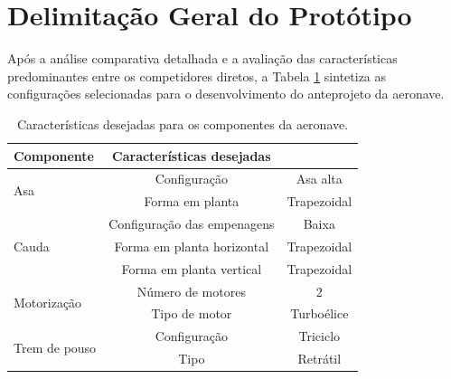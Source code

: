 \section{Delimitação Geral do Protótipo}

Após a análise comparativa detalhada e a avaliação das características predominantes entre os competidores diretos, a Tabela \ref{tab:delimitacao_prototipo} sintetiza as configurações selecionadas para o desenvolvimento do anteprojeto da aeronave.

\begin{table}[h!]
\centering
\caption{Características desejadas para os componentes da aeronave.}
\label{tab:delimitacao_prototipo}
\vspace{0.2cm} %
\renewcommand{\arraystretch}{1.2} %
\begin{tabular}{lcc}
\hline
\textbf{Componente} & \textbf{Características desejadas} & \\
\hline
\multirow{2}{*}{Asa} & Configuração & Asa alta \\
 & Forma em planta & Trapezoidal \\
\hline
\multirow{3}{*}{Cauda} & Configuração das empenagens & Baixa \\
 & Forma em planta horizontal & Trapezoidal \\
 & Forma em planta vertical & Trapezoidal \\
\hline
\multirow{2}{*}{Motorização} & Número de motores & 2 \\
 & Tipo de motor & Turboélice \\
\hline
\multirow{2}{*}{Trem de pouso} & Configuração & Triciclo \\
 & Tipo & Retrátil \\
\hline
\end{tabular}
\end{table}

